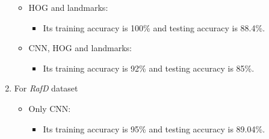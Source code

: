 \begin{enumerate}
\begin{itemize}
    \item HOG and landmarks: 
        \begin{itemize}
            \item Its training accuracy is 100\% and testing accuracy is 88.4\%.
        \end{itemize}
    \item CNN, HOG and landmarks: 
        \begin{itemize}
            \item Its training accuracy is 92\% and testing accuracy is 85\%.
        \end{itemize}
\end{itemize}
\item For \textit{RafD} dataset \newline
\begin{itemize}
    \item Only CNN: 
        \begin{itemize}
            \item Its training accuracy is 95\% and testing accuracy is 89.04\%.
        \end{itemize}

	\begin{comment}
    \item Only HOG: 
        \begin{itemize}
            \item It takes X time in training and X time in testing.
            \item The model size was X.
            \item Its training accuracy is X and testing accuracy is X .
        \end{itemize}
    \item Only landmarks: 
        \begin{itemize}
            \item It takes X time in training and X time in testing.
            \item The model size was X.
            \item Its training accuracy is X and testing accuracy is X.
        \end{itemize}
	\end{comment}


\end{itemize}
\end{enumerate}
